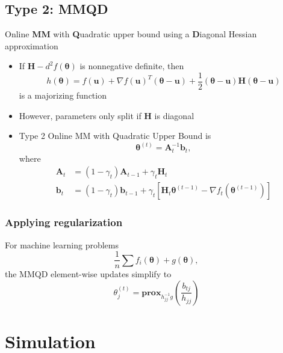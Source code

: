 \documentclass{beamer}
\newcommand{\iter}[2]{#1^{(#2)}}
\begin{document}
\subsection{Type 2: MMQD}
\begin{frame}
  Online \textbf{MM} with \textbf{Q}uadratic upper bound using a \textbf{D}iagonal Hessian approximation
\end{frame}
\begin{frame}
  \begin{itemize}
    \item If $\bm H - d^2 f(\bm\theta)$ is nonnegative definite, then
    $$h(\bm\theta) = f(\bm u) + \nabla f(\bm u)^T(\bm\theta - \bm u) + \frac{1}{2}(\bm\theta - \bm u)\bm H(\bm\theta - \bm u)$$
    is a majorizing function
    \item However, parameters only split if $\bm H$ is diagonal
  \end{itemize}
\end{frame}
\begin{frame}
  \begin{itemize}
    \item Type 2 Online MM with Quadratic Upper Bound is
    $$\iter{\bm\theta}{t} = \bm A_t^{-1}\bm b_t,$$
    where
    $$\begin{aligned}
      \bm A_t &= (1 - \gamma_t)\bm A_{t-1} + \gamma_t \bm H_t \\
      \bm b_t &= (1 - \gamma_t)\bm b_{t-1} + \gamma_t[\bm H_t\iter{\bm\theta}{t-1} - \nabla f_t(\iter{\bm\theta}{t-1})]
      \end{aligned}$$
  \end{itemize}
\end{frame}
\begin{frame}
  \frametitle{Applying regularization}
  For machine learning problems
    $$\frac{1}{n}\sum f_i(\bm\theta) + g(\bm\theta),$$
    the MMQD element-wise updates simplify to
    $$\iter{\theta_j}{t} = \mathbf{prox}_{h_{jj}^{-1}g}\left(\frac{b_{tj}}{h_{jj}}\right)$$
\end{frame}

\section{Simulation}
\end{document}
